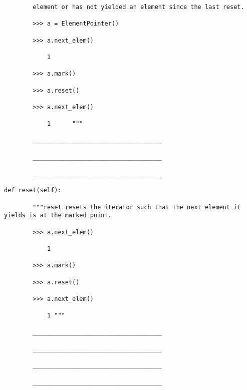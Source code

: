 \documentclass{exam}
\begin{document}
\begin{questions}
\begin{lstlisting}
		element or has not yielded an element since the last reset.
		
		>>> a = ElementPointer()
		
		>>> a.next_elem()
		
			1	
		
		>>> a.mark()
		
		>>> a.reset()
		
		>>> a.next_elem()
		
			1      """
		
		____________________________________
		
		____________________________________
		
		____________________________________
		
def reset(self):
		
		"""reset resets the iterator such that the next element it yields is at the marked point.
		
		>>> a.next_elem()
		
			1	
		
		>>> a.mark()
		
		>>> a.reset()
		
		>>> a.next_elem()
		
			1 """
		
		____________________________________
		
		____________________________________
		
		____________________________________
		
		____________________________________
\end{lstlisting}

\end{questions}
\end{document}

